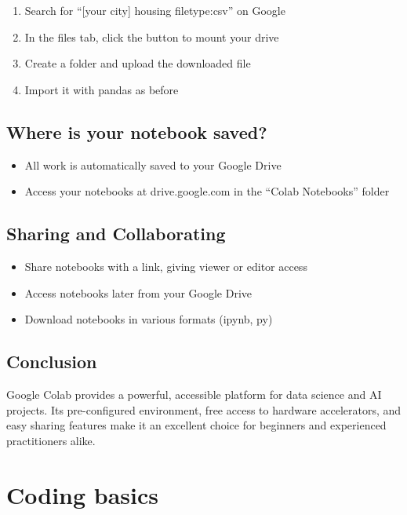 \documentclass[
  letterpaper,
  DIV=11,
  numbers=noendperiod]{scrreprt}
\providecommand{\tightlist}{%
  \setlength{\itemsep}{0pt}\setlength{\parskip}{0pt}}\usepackage{longtable,booktabs,array}
\begin{document}
\begin{enumerate}
\def\labelenumi{\arabic{enumi}.}
\tightlist
\item
  Search for ``{[}your city{]} housing filetype:csv'' on Google
\item
  In the files tab, click the button to mount your drive
\item
  Create a folder and upload the downloaded file
\item
  Import it with pandas as before
\end{enumerate}

\section{Where is your notebook
saved?}\label{where-is-your-notebook-saved}

\begin{itemize}
\tightlist
\item
  All work is automatically saved to your Google Drive
\item
  Access your notebooks at drive.google.com in the ``Colab Notebooks''
  folder
\end{itemize}

\section{Sharing and Collaborating}\label{sharing-and-collaborating}

\begin{itemize}
\tightlist
\item
  Share notebooks with a link, giving viewer or editor access
\item
  Access notebooks later from your Google Drive
\item
  Download notebooks in various formats (ipynb, py)
\end{itemize}

\section{Conclusion}\label{conclusion}

Google Colab provides a powerful, accessible platform for data science
and AI projects. Its pre-configured environment, free access to hardware
accelerators, and easy sharing features make it an excellent choice for
beginners and experienced practitioners alike.

\chapter{Coding basics}\label{coding-basics}
\end{document}
